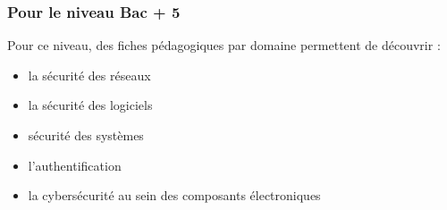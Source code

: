 \subsubsection{Pour le niveau Bac + 5} 

Pour ce niveau, des fiches pédagogiques par domaine permettent de découvrir :
\begin{itemize}
	\item la sécurité des réseaux
	\item la sécurité des logiciels
	\item sécurité des systèmes
	\item l’authentification
	\item la cybersécurité au sein des composants électroniques
\end{itemize}


